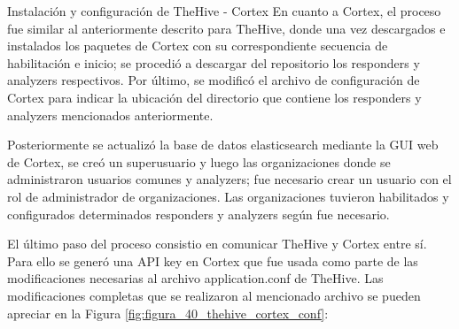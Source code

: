 \begin{section}{Instalación y configuración de TheHive - Cortex}
        En cuanto a Cortex, el proceso fue similar al anteriormente descrito para TheHive, donde una vez descargados e instalados los paquetes de Cortex con su correspondiente secuencia de habilitación e inicio; se procedió a descargar del repositorio los responders y analyzers respectivos. Por último, se modificó el archivo de configuración de Cortex para indicar la ubicación del directorio que contiene los responders y analyzers mencionados anteriormente. \par
        Posteriormente se actualizó la base de datos elasticsearch mediante la GUI web de Cortex, se creó un superusuario y luego las organizaciones donde se administraron usuarios comunes y analyzers; fue necesario crear un usuario con el rol de administrador de organizaciones. Las organizaciones tuvieron habilitados y configurados determinados responders y analyzers según fue necesario. \par
        El último paso del proceso consistio en comunicar TheHive y Cortex entre sí. Para ello se generó una API key en Cortex que fue usada como parte de las modificaciones necesarias al archivo application.conf de TheHive. Las modificaciones completas que se realizaron al mencionado archivo se pueden apreciar en la Figura \ref{fig:figura_40_thehive_cortex_conf}:\par
        

\end{section}
